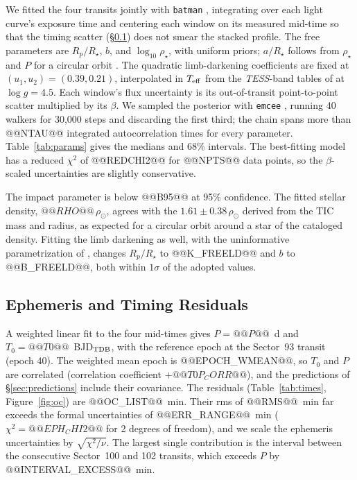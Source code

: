 \documentclass[twocolumn,linenumbers]{aastex701}
\newcommand{\tess}{\textit{TESS}}
\begin{document}
We fitted the four transits jointly with \texttt{batman} \citep{Kreidberg2015}, integrating over each light curve's exposure time and centering each window on its measured mid-time so that the timing scatter (\S\ref{sec:ttv}) does not smear the stacked profile. The free parameters are $R_p/R_\star$, $b$, and $\log_{10}\rho_\star$, with uniform priors; $a/R_\star$ follows from $\rho_\star$ and $P$ for a circular orbit \citep{Seager2003}. The quadratic limb-darkening coefficients are fixed at $(u_1, u_2) = (0.39, 0.21)$, interpolated in $T_{\rm eff}$ from the \tess-band tables of \citet{Claret2017} at $\log g = 4.5$. Each window's flux uncertainty is its out-of-transit point-to-point scatter multiplied by its $\beta$. We sampled the posterior with \texttt{emcee} \citep{Goodman2010, ForemanMackey2013}, running 40 walkers for 30,000 steps and discarding the first third; the chain spans more than @@NTAU@@ integrated autocorrelation times for every parameter. Table~\ref{tab:params} gives the medians and 68\% intervals. The best-fitting model has a reduced $\chi^2$ of @@REDCHI2@@ for @@NPTS@@ data points, so the $\beta$-scaled uncertainties are slightly conservative.

The impact parameter is below @@B95@@ at 95\% confidence. The fitted stellar density, $@@RHO@@\,\rho_\odot$, agrees with the $1.61 \pm 0.38\,\rho_\odot$ derived from the TIC mass and radius, as expected for a circular orbit around a star of the cataloged density. Fitting the limb darkening as well, with the uninformative parametrization of \citet{Kipping2013}, changes $R_p/R_\star$ to @@K_FREELD@@ and $b$ to @@B_FREELD@@, both within $1\sigma$ of the adopted values.

\subsection{Ephemeris and Timing Residuals} \label{sec:ttv}

A weighted linear fit to the four mid-times gives $P = @@P@@$~d and $T_0 = @@T0@@$~BJD$_{\rm TDB}$, with the reference epoch at the Sector~93 transit (epoch 40). The weighted mean epoch is @@EPOCH_WMEAN@@, so $T_0$ and $P$ are correlated (correlation coefficient $+@@T0P_CORR@@$), and the predictions of \S\ref{sec:predictions} include their covariance. The residuals (Table~\ref{tab:times}, Figure~\ref{fig:oc}) are @@OC_LIST@@~min. Their rms of @@RMS@@~min far exceeds the formal uncertainties of @@ERR_RANGE@@~min ($\chi^2 = @@EPH_CHI2@@$ for 2 degrees of freedom), and we scale the ephemeris uncertainties by $\sqrt{\chi^2/\nu}$. The largest single contribution is the interval between the consecutive Sector~100 and 102 transits, which exceeds $P$ by @@INTERVAL_EXCESS@@~min.
\end{document}
